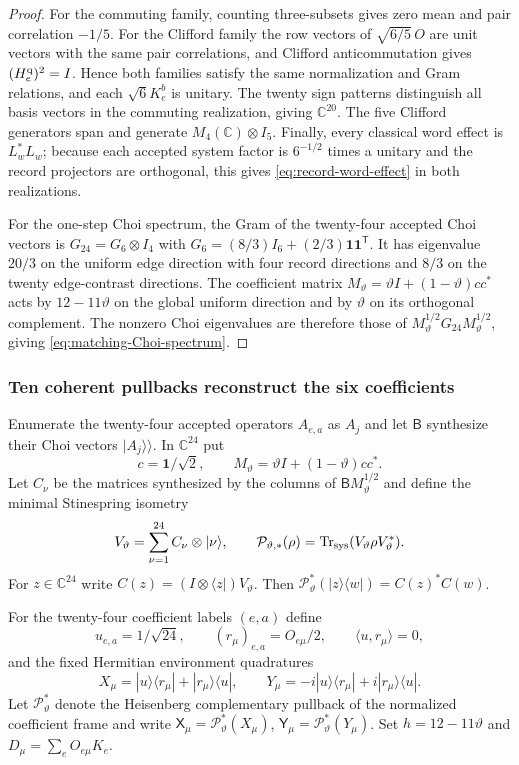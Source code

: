 \documentclass[11pt]{article}
\numberwithin{equation}{section}
\theoremstyle{definition}
\theoremstyle{remark}
\newcommand{\C}{\mathbb C}
\newcommand{\Tr}{\operatorname{Tr}}
\begin{document}
\begin{proof}
For the commuting family, counting three-subsets gives zero mean and pair
correlation $-1/5$.  For the Clifford family the row vectors of
$\sqrt{6/5}\,O$ are unit vectors with the same pair correlations, and
Clifford anticommutation gives $(H_e^{\rm q})^2=I$.  Hence both families
satisfy the same normalization and Gram relations, and each $\sqrt6K_e^b$
is unitary.  The twenty sign patterns distinguish all basis vectors in the
commuting realization, giving $\C^{20}$.  The five Clifford generators span
and generate $M_4(\C)\otimes I_5$.  Finally, every classical word effect is
$L_w^*L_w$; because each accepted system factor is $6^{-1/2}$ times a
unitary and the record projectors are orthogonal, this gives
\eqref{eq:record-word-effect} in both realizations.

For the one-step Choi spectrum, the Gram of the twenty-four accepted Choi
vectors is $G_{24}=G_6\otimes I_4$ with
$G_6=(8/3)I_6+(2/3)\mathbf1\mathbf1^{\mathsf T}$.  It has eigenvalue
$20/3$ on the uniform edge direction with four record directions and
$8/3$ on the twenty edge-contrast directions.  The coefficient matrix
$M_\vartheta=\vartheta I+(1-\vartheta)cc^*$ acts by
$12-11\vartheta$ on the global uniform direction and by $\vartheta$ on its
orthogonal complement.  The nonzero Choi eigenvalues are therefore those of
$M_\vartheta^{1/2}G_{24}M_\vartheta^{1/2}$, giving
\eqref{eq:matching-Choi-spectrum}.
\end{proof}

\subsubsection{Ten coherent pullbacks reconstruct the six coefficients}

Enumerate the twenty-four accepted operators $A_{e,a}$ as $A_j$ and let
$\mathsf B$ synthesize their Choi vectors $|A_j\rangle\!\rangle$.  In
$\C^{24}$ put
\[
 c=\mathbf1/\sqrt2,
 \qquad
 M_\vartheta=\vartheta I+(1-\vartheta)cc^*.
\]
Let $C_\nu$ be the matrices synthesized by the columns of
$\mathsf B M_\vartheta^{1/2}$ and define the minimal Stinespring isometry
\[
 V_\vartheta=\sum_{\nu=1}^{24}C_\nu\otimes|\nu\rangle,
 \qquad
 \mathcal P_{\vartheta,*}(\rho)
 =\Tr_{\rm sys}(V_\vartheta\rho V_\vartheta^*).
\]
For $z\in\C^{24}$ write
$C(z)=(I\otimes\langle z|)V_\vartheta$.  Then
$\mathcal P_\vartheta^*(|z\rangle\langle w|)=C(z)^*C(w)$.

For the twenty-four coefficient labels $(e,a)$ define
\[
 u_{e,a}=1/\sqrt{24},
 \qquad (r_\mu)_{e,a}=O_{e\mu}/2,
 \qquad \langle u,r_\mu\rangle=0,
\]
and the fixed Hermitian environment quadratures
\begin{equation}
 X_\mu=|u\rangle\langle r_\mu|+|r_\mu\rangle\langle u|,
 \qquad
 Y_\mu=-i|u\rangle\langle r_\mu|+i|r_\mu\rangle\langle u|.
 \label{eq:ten-quadratures}
\end{equation}
Let $\mathcal P_\vartheta^*$ denote the Heisenberg complementary pullback of
the normalized coefficient frame and write
$\mathsf X_\mu=\mathcal P_\vartheta^*(X_\mu)$,
$\mathsf Y_\mu=\mathcal P_\vartheta^*(Y_\mu)$.  Set
$h=12-11\vartheta$ and $D_\mu=\sum_eO_{e\mu}K_e$.
\end{document}
